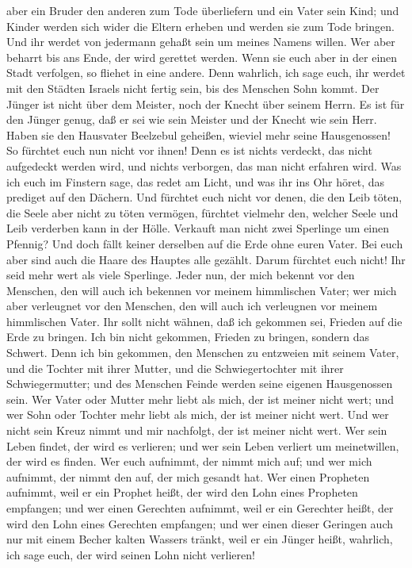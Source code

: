 aber ein Bruder den anderen zum Tode überliefern und ein Vater sein
Kind; und Kinder werden sich wider die Eltern erheben und werden sie zum
Tode bringen.  Und ihr werdet von jedermann gehaßt sein
um meines Namens willen. Wer aber beharrt bis ans Ende, der wird
gerettet werden.  Wenn sie euch aber in der einen Stadt
verfolgen, so fliehet in eine andere. Denn wahrlich, ich sage euch, ihr
werdet mit den Städten Israels nicht fertig sein, bis des Menschen Sohn
kommt.  Der Jünger ist nicht über dem Meister, noch der
Knecht über seinem Herrn.  Es ist für den Jünger genug,
daß er sei wie sein Meister und der Knecht wie sein Herr. Haben sie den
Hausvater Beelzebul geheißen, wieviel mehr seine Hausgenossen!
 So fürchtet euch nun nicht vor ihnen! Denn es ist nichts
verdeckt, das nicht aufgedeckt werden wird, und nichts verborgen, das
man nicht erfahren wird.  Was ich euch im Finstern sage,
das redet am Licht, und was ihr ins Ohr höret, das prediget auf den
Dächern.  Und fürchtet euch nicht vor denen, die den Leib
töten, die Seele aber nicht zu töten vermögen, fürchtet vielmehr den,
welcher Seele und Leib verderben kann in der Hölle. 
Verkauft man nicht zwei Sperlinge um einen Pfennig? Und doch fällt
keiner derselben auf die Erde ohne euren Vater.  Bei euch
aber sind auch die Haare des Hauptes alle gezählt.  Darum
fürchtet euch nicht! Ihr seid mehr wert als viele Sperlinge.
 Jeder nun, der mich bekennt vor den Menschen, den will
auch ich bekennen vor meinem himmlischen Vater;  wer mich
aber verleugnet vor den Menschen, den will auch ich verleugnen vor
meinem himmlischen Vater.  Ihr sollt nicht wähnen, daß
ich gekommen sei, Frieden auf die Erde zu bringen. Ich bin nicht
gekommen, Frieden zu bringen, sondern das Schwert.  Denn
ich bin gekommen, den Menschen zu entzweien mit seinem Vater, und die
Tochter mit ihrer Mutter, und die Schwiegertochter mit ihrer
Schwiegermutter;  und des Menschen Feinde werden seine
eigenen Hausgenossen sein.  Wer Vater oder Mutter mehr
liebt als mich, der ist meiner nicht wert; und wer Sohn oder Tochter
mehr liebt als mich, der ist meiner nicht wert.  Und wer
nicht sein Kreuz nimmt und mir nachfolgt, der ist meiner nicht wert.
 Wer sein Leben findet, der wird es verlieren; und wer
sein Leben verliert um meinetwillen, der wird es finden. 
Wer euch aufnimmt, der nimmt mich auf; und wer mich aufnimmt, der nimmt
den auf, der mich gesandt hat.  Wer einen Propheten
aufnimmt, weil er ein Prophet heißt, der wird den Lohn eines Propheten
empfangen; und wer einen Gerechten aufnimmt, weil er ein Gerechter
heißt, der wird den Lohn eines Gerechten empfangen;  und
wer einen dieser Geringen auch nur mit einem Becher kalten Wassers
tränkt, weil er ein Jünger heißt, wahrlich, ich sage euch, der wird
seinen Lohn nicht verlieren!

